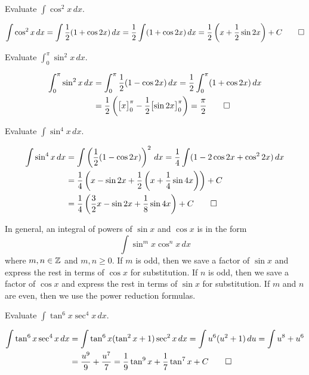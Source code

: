 \begin{problem}
    Evaluate \(\displaystyle{\int\cos^2 x\,dx}\).
\end{problem}
\begin{solution}
    \[\int\cos^2 x\,dx=\int\frac{1}{2}(1+\cos 2x)\,dx
    =\frac{1}{2}\int(1+\cos 2x)\,dx
    =\frac{1}{2}\left(x+\frac{1}{2}\sin 2x\right)+C\qedhere\]
\end{solution}
\begin{problem}
    Evaluate \(\displaystyle{\int_0^\pi\sin^2 x\,dx}\).
\end{problem}
\begin{solution}
    \begin{align*}
    \int_0^\pi\sin^2 x\,dx &= \int_0^\pi\frac{1}{2}(1-\cos 2x)\,dx
    =\frac{1}{2}\int_0^{\pi}(1+\cos 2x)\,dx \\
    &=\frac{1}{2}
    \left(\bigl[x\bigr]_0^\pi-\frac{1}{2}\bigl[\sin 2x\bigr]_0^\pi\right)
    =\frac{\pi}{2} \qedhere
    \end{align*}
\end{solution}
\begin{problem}
    Evaluate \(\displaystyle{\int\sin^4 x\,dx}\).
\end{problem}
\begin{solution}
    \begin{align*}
        \int\sin^4 x\,dx &= \int\left(\frac{1}{2}(1-\cos 2x)\right)^2\,dx
        =\frac{1}{4}\int(1-2\cos 2x+\cos^2 2x)\,dx \\
        &= \frac{1}{4}
        \left(x-\sin 2x+\frac{1}{2}
        \left(x+\frac{1}{4}\sin 4x\right)\right)+C \\
        &= \frac{1}{4}
        \left(\frac{3}{2}x-\sin 2x+\frac{1}{8}\sin 4x\right)+C \qedhere
    \end{align*}
\end{solution}
In general, an integral of powers of \(\sin x\) and \(\cos x\) is in the
form
\[\int\sin^m x\cos^n x\,dx\]
where \(m,n\in\mathbb{Z}\) and \(m,n\geq 0\).
If \(m\) is odd, then we save a factor of \(\sin x\) and express the rest in
terms of \(\cos x\) for substitution.
If \(n\) is odd, then we save a factor of \(\cos x\) and express the rest in
terms of \(\sin x\) for substitution.
If \(m\) and \(n\) are even, then we use the power reduction formulas.
\begin{problem}
    Evaluate \(\displaystyle{\int\tan^6 x\sec^4 x\,dx}\).
\end{problem}
\begin{solution}
    \begin{align*}
        \int\tan^6 x\sec^4 x\,dx &= \int\tan^6 x(\tan^2 x+1)\sec^2 x\,dx
        =\int u^6(u^2+1)\,du=\int u^8+u^6 \\
        & =\frac{u^9}{9}+\frac{u^7}{7}
        =\frac{1}{9}\tan^9 x+\frac{1}{7}\tan^7 x+C \qedhere
    \end{align*}
\end{solution}
